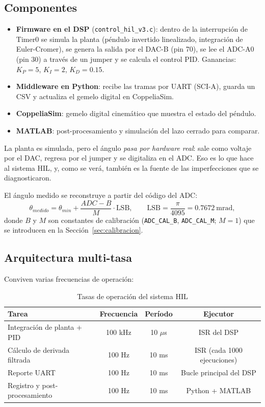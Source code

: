 \documentclass[11pt,a4paper]{article}
\begin{document}
\subsection{Componentes}

\begin{itemize}
    \item \textbf{Firmware en el DSP} (\texttt{control\_hil\_v3.c}): dentro de la interrupción de Timer0 se simula la planta (péndulo invertido linealizado, integración de Euler-Cromer), se genera la salida por el DAC-B (pin 70), se lee el ADC-A0 (pin 30) a través de un jumper y se calcula el control PID. Ganancias: $K_P=5$, $K_I=2$, $K_D=0.15$.
    \item \textbf{Middleware en Python}: recibe las tramas por UART (SCI-A), guarda un CSV y actualiza el gemelo digital en CoppeliaSim.
    \item \textbf{CoppeliaSim}: gemelo digital cinemático que muestra el estado del péndulo.
    \item \textbf{MATLAB}: post-procesamiento y simulación del lazo cerrado para comparar.
\end{itemize}

La planta es simulada, pero el ángulo \emph{pasa por hardware real}: sale como voltaje por el DAC, regresa por el jumper y se digitaliza en el ADC. Eso es lo que hace al sistema HIL, y, como se verá, también es la fuente de las imperfecciones que se diagnosticaron.

El ángulo medido se reconstruye a partir del código del ADC:
\begin{equation}
\theta_{medido} = \theta_{min} + \frac{ADC - B}{M}\cdot \text{LSB},\qquad \text{LSB}=\frac{\pi}{4095}=0.7672\ \text{mrad},
\end{equation}
donde $B$ y $M$ son constantes de calibración (\texttt{ADC\_CAL\_B}, \texttt{ADC\_CAL\_M}; $M=1$) que se introducen en la Sección~\ref{sec:calibracion}.

\subsection{Arquitectura multi-tasa}

Conviven varias frecuencias de operación:

\begin{table}[H]
\centering
\caption{Tasas de operación del sistema HIL}
\begin{tabular}{lccc}
\hline
\textbf{Tarea} & \textbf{Frecuencia} & \textbf{Período} & \textbf{Ejecutor} \\
\hline
Integración de planta + PID & 100 kHz & 10 $\mu$s & ISR del DSP \\
Cálculo de derivada filtrada & 100 Hz & 10 ms & ISR (cada 1000 ejecuciones) \\
Reporte UART & 100 Hz & 10 ms & Bucle principal del DSP \\
Registro y post-procesamiento & 100 Hz & 10 ms & Python + MATLAB \\
\hline
\end{tabular}
\end{table}
\end{document}
